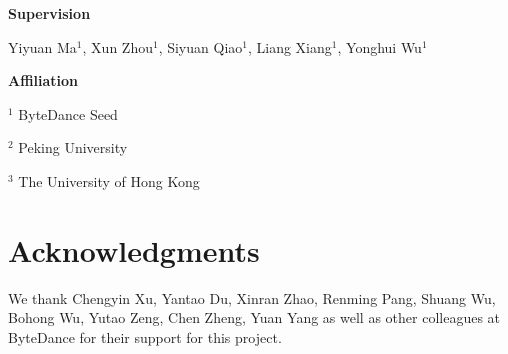
\textbf{Supervision}

Yiyuan Ma$^{1}$, Xun Zhou$^{1}$, Siyuan Qiao$^{1}$, Liang Xiang$^{1}$, Yonghui Wu$^{1}$


\textbf{Affiliation}

$^1$ ByteDance Seed

$^2$ Peking University

$^3$ The University of Hong Kong

\section{Acknowledgments}
We thank Chengyin Xu, Yantao Du, Xinran Zhao, Renming Pang, Shuang Wu, Bohong Wu, Yutao Zeng, Chen Zheng, Yuan Yang as well as other colleagues at ByteDance for their support for this project.